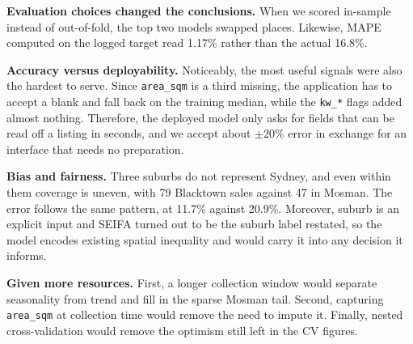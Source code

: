 \textbf{Evaluation choices changed the conclusions.} When we scored in-sample instead of
out-of-fold, the top two models swapped places. Likewise, MAPE computed on the logged
target read 1.17\% rather than the actual 16.8\%.

\textbf{Accuracy versus deployability.} Noticeably, the most useful signals were also the
hardest to serve. Since \texttt{area\_sqm} is a third missing, the application has to
accept a blank and fall back on the training median, while the \texttt{kw\_*} flags
added almost nothing. Therefore, the deployed model only asks for fields that can be read
off a listing in seconds, and we accept about $\pm 20\%$ error in exchange for an
interface that needs no preparation.

\textbf{Bias and fairness.} Three suburbs do not represent Sydney, and even within them
coverage is uneven, with 79 Blacktown sales against 47 in Mosman. The error follows the
same pattern, at 11.7\% against 20.9\%. Moreover, suburb is an explicit input and SEIFA
turned out to be the suburb label restated, so the model encodes existing spatial
inequality and would carry it into any decision it informs.

\textbf{Given more resources.} First, a longer collection window would separate
seasonality from trend and fill in the sparse Mosman tail. Second, capturing
\texttt{area\_sqm} at collection time would remove the need to impute it. Finally,
nested cross-validation would remove the optimism still left in the CV figures.

